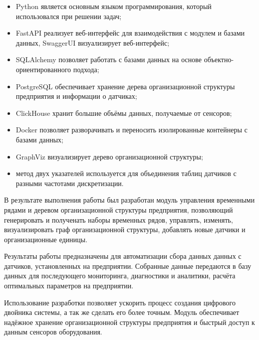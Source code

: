 \begin{itemize}
    \item Python является основным языком программирования, который использовался при решении задач;
    \item FastAPI реализует веб-интерфейс для взаимодействия с модулем и базами данных, SwaggerUI визуализирует веб-интерфейс;
    \item SQLAlchemy позволяет работать с базами данных на основе объектно-ориентированного подхода;
    \item PostgreSQL обеспечивает хранение дерева организационной структуры предприятия и информации о датчиках;
    \item ClickHouse хранит большие объёмы данных, получаемые от сенсоров;
    \item Docker позволяет разворачивать и переносить изолированные контейнеры с базами данных;
    \item GraphViz визуализирует дерево организационной структуры;
    \item метод двух указателей используется для объединения таблиц датчиков с разными частотами дискретизации.
\end{itemize}

В результате выполнения работы был разработан модуль управления временными рядами и деревом организационной структуры предприятия, позволяющий генерировать и полученать наборы временных рядов, управлять, изменять, визуализировать граф организационной структуры, добавлять новые датчики и организационные единицы.

Результаты работы предназначены для автоматизации сбора данных данных с датчиков, установленных на предприятии. Собранные данные передаются в базу данных для последующего мониторинга, диагностики и аналитики, расчёта оптимальных параметров на предприятии.

Использование разработки позволяет ускорить процесс создания цифрового двойника системы, а так же сделать его более точным. Модуль обеспечивает надёжное хранение организационной структуры предприятия и быстрый доступ к данным сенсоров оборудования.